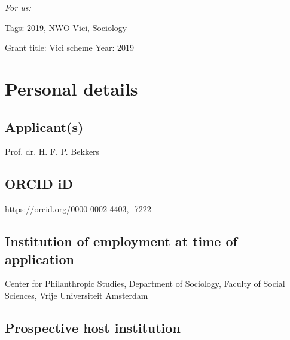\documentclass[twocolumn, serif, rga, numeric]{jote-article}
\begin{document}
\emph{For us:}

Tags: 2019, NWO Vici, Sociology 

Grant title: Vici scheme 
Year: 2019 
\hfill\break 
{} {}\section*{Personal details} 

 {}\subsection*{Applicant(s)} 

Prof. dr.  H. F. P. Bekkers 
 {}\subsection*{ORCID iD} 

\url{https://orcid.org/0000-0002-4403, -7222}

 {}\subsection*{Institution of employment at time of application} 

Center for Philanthropic Studies, Department of Sociology, Faculty of Social Sciences, Vrije Universiteit Amsterdam 
 {}\subsection*{Prospective host institution} 
\end{document}
